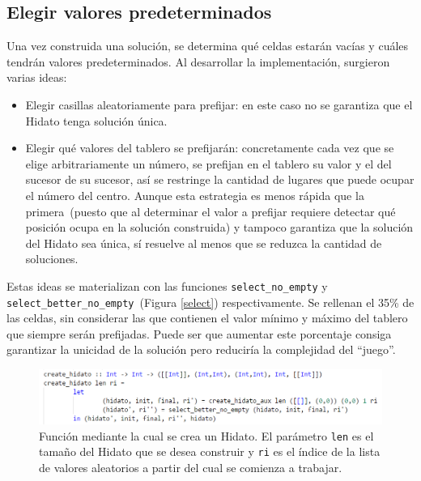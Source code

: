 \documentclass{llncs}
\begin{document}
\subsection{Elegir valores predeterminados}
Una vez construida una soluci\'on, se determina qu\'e celdas estar\'an vac\'ias y cu\'ales tendr\'an valores predeterminados. Al desarrollar la implementaci\'on, surgieron varias ideas:
\begin{itemize}
\item Elegir casillas aleatoriamente para prefijar: en este caso no se garantiza que el Hidato tenga soluci\'on \'unica.
\item Elegir qu\'e valores del tablero se prefijar\'an: concretamente cada vez que se elige arbitrariamente un n\'umero, se prefijan en el tablero su valor y el del sucesor de su sucesor, as\'i se restringe la cantidad de lugares que puede ocupar el n\'umero del centro. Aunque esta estrategia es menos r\'apida que la primera~(puesto que al determinar el valor a prefijar requiere detectar qu\'e posici\'on ocupa en la soluci\'on construida) y tampoco garantiza que la soluci\'on del Hidato sea \'unica, s\'i resuelve al menos que se reduzca la cantidad de soluciones.
\end{itemize}


Estas ideas se materializan con las funciones \texttt{select\_no\_empty} y\\ \texttt{select\_better\_no\_empty}~(Figura \ref{select}) respectivamente. Se rellenan el 35\% de las celdas, sin considerar las que contienen el valor m\'inimo y m\'aximo  del tablero que siempre ser\'an prefijadas. Puede ser que aumentar este porcentaje consiga garantizar la unicidad de la soluci\'on pero reducir\'ia la complejidad del ``juego''.

\begin{figure}
\begin{center}
\includegraphics[width= 1\columnwidth]{figuras/createh}
\end{center}
\caption{Funci\'on mediante la cual se crea un Hidato. El par\'ametro \texttt{len} es el tama\~no del Hidato que se desea construir y \texttt{ri} es el \'indice de la lista de valores aleatorios a partir del cual se comienza a trabajar.}
\label{create}
\end{figure}
\end{document}
